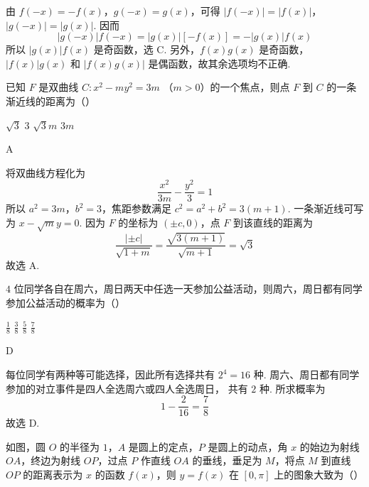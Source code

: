 \begin{solution}
由 \(f(-x)=-f(x)\)，\(g(-x)=g(x)\)，可得
\(|f(-x)|=|f(x)|\)，\(|g(-x)|=|g(x)|\). 因而
\[
|g(-x)|f(-x)=|g(x)|[-f(x)]=-\lvert g(x)\rvert f(x)
\]
所以 \(|g(x)|f(x)\) 是奇函数，选 C. 另外，\(f(x)g(x)\) 是奇函数，
\(|f(x)|g(x)\) 和 \(|f(x)g(x)|\) 是偶函数，故其余选项均不正确.
\end{solution}

\begin{problem}
已知 \(F\) 是双曲线 \(C: x^{2} - my^{2} = 3m \) （\(m > 0\)）的一个焦点，则点 \(F\) 到 \(C\) 的一条渐近线的距离为（\quad）

\choices
    {\(\sqrt{3}\)}
    {3}
    {\(\sqrt{3} m\)}
    {\(3m\)}
\end{problem}

\begin{answer}
A
\end{answer}

\begin{solution}
将双曲线方程化为
\[
\frac{x^2}{3m}-\frac{y^2}{3}=1
\]
所以 \(a^2=3m\)，\(b^2=3\)，焦距参数满足
\(c^2=a^2+b^2=3(m+1)\). 一条渐近线可写为
\(x-\sqrt m y=0\). 因为 \(F\) 的坐标为 \((\pm c,0)\)，点 \(F\) 到该直线的距离为
\[
\frac{|\pm c|}{\sqrt{1+m}}=\frac{\sqrt{3(m+1)}}{\sqrt{m+1}}=\sqrt3
\]
故选 A.
\end{solution}

\begin{problem}
\(4\) 位同学各自在周六，周日两天中任选一天参加公益活动，则周六，周日都有同学参加公益活动的概率为（\quad）

\choices
    {\( \frac{1}{8} \)}
    {\( \frac{3}{8} \)}
    {\( \frac{5}{8} \)}
    {\( \frac{7}{8} \)}
\end{problem}

\begin{answer}
D
\end{answer}

\begin{solution}
每位同学有两种等可能选择，因此所有选择共有 \(2^4=16\) 种. 周六、周日都有同学参加的对立事件是四人全选周六或四人全选周日，
共有 \(2\) 种. 所求概率为
\[
1-\frac{2}{16}=\frac78
\]
故选 D.
\end{solution}

\begin{problem}
如图，圆 \(O\) 的半径为 \(1\)，\(A\) 是圆上的定点，\(P\) 是圆上的动点，角 \(x\) 的始边为射线 \(OA\)，终边为射线 \(OP\)，过点 \(P\) 作直线 \(OA\) 的垂线，垂足为 \(M\)，将点 \(M\) 到直线 \(OP\) 的距离表示为 \(x\) 的函数 \(f(x)\)，则 \(y = f(x)\) 在 \(\left[0, \pi\right]\) 上的图象大致为（\quad）


    {}
    {}
    {}
\end{problem}

